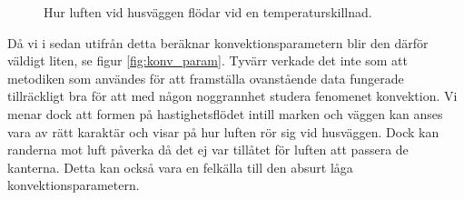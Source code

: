 \begin{figure}[hpbt]
\begin{center}
\caption{\label{fig:velocityfield} Hur luften vid husväggen flödar vid en temperaturskillnad.}
\end{center}
\end{figure}

Då vi i sedan utifrån detta beräknar konvektionsparametern blir den därför väldigt liten,
se figur \ref{fig:konv_param}. Tyvärr verkade det inte som att metodiken som användes
för att framställa ovanstående data fungerade tillräckligt bra för att med någon
noggrannhet studera fenomenet konvektion.  Vi menar dock att formen på hastighetsflödet intill marken och väggen
kan anses vara av rätt karaktär och visar på hur luften rör sig vid husväggen. Dock kan randerna mot
luft påverka då det ej var tillåtet för luften att passera de
kanterna. Detta kan också vara en felkälla till den absurt låga konvektionsparametern.


